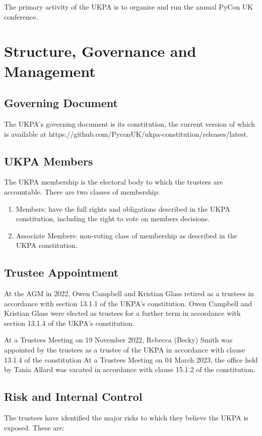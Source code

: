 \documentclass[11pt, final]{article}
\begin{document}
The primary activity of the UKPA is to organise and run the annual PyCon UK conference.

\section{Structure, Governance and Management}

\subsection{Governing Document}
The UKPA's governing document is its constitution, the current version of which is available at https://github.com/PyconUK/ukpa-constitution/releases/latest.

\subsection{UKPA Members}
The UKPA membership is the electoral body to which the trustees are accountable.
There are two classes of membership:

\begin{enumerate}
	\item Members: have the full rights and obligations described in the UKPA constitution, including the right to vote on members decisions.
	\item Associate Members: non-voting class of membership as described in the UKPA constitution.
\end{enumerate}

\subsection{Trustee Appointment}
At the AGM in 2022, Owen Campbell and Kristian Glass retired as a trustees in accordance with section 13.1.1 of the UKPA's constitution.
Owen Campbell and Kristian Glass were elected as trustees for a further term in accordance with section 13.1.4 of the UKPA's constitution.

At a Trustees Meeting on 19 November 2022, Rebecca (Becky) Smith was appointed by the trustees as a trustee of the UKPA in accordance with clause 13.1.4 of the constitution
At a Trustees Meeting on 04 March 2023, the office held by Tania Allard was vacated in accordance with clause 15.1.2 of the constitution.
\subsection{Risk and Internal Control}
The trustees have identified the major risks to which they believe the UKPA is exposed. These are:
\end{document}
